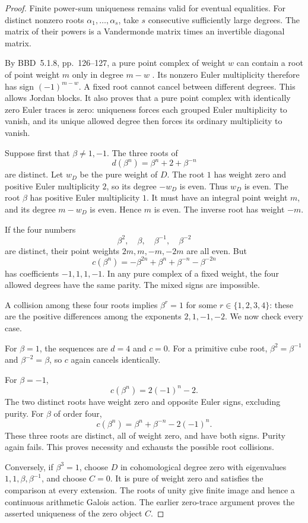 \documentclass[11pt,a4paper]{article}
\theoremstyle{named}\newtheorem{finding}{Finding}[section]
\theoremstyle{definition}\newtheorem{definition}[finding]{Definition}
\theoremstyle{remark}\newtheorem{remark}[finding]{Remark}
\begin{document}
\begin{proof}
Finite power-sum uniqueness remains valid for eventual
equalities. For distinct nonzero roots
\(\alpha_1,\ldots,\alpha_s\), take \(s\) consecutive
sufficiently large degrees. The matrix of their powers
is a Vandermonde matrix times an invertible diagonal
matrix.

By BBD~5.1.8, pp.~126--127, a pure point complex of
weight \(w\) can contain a root of point weight \(m\)
only in degree \(m-w\) \cite{BBD}.
Its nonzero Euler multiplicity therefore has sign
\((-1)^{m-w}\). A fixed root cannot cancel between
different degrees. This allows Jordan blocks.
It also proves that a pure point complex with
identically zero Euler traces is zero: uniqueness
forces each grouped Euler multiplicity to vanish,
and its unique allowed degree then forces its
ordinary multiplicity to vanish.

Suppose first that \(\beta\ne1,-1\).
The three roots of
\[
                     d(\beta^n)=\beta^n+2+\beta^{-n}
\]
are distinct. Let \(w_D\) be the pure weight of \(D\).
The root \(1\) has weight zero and positive Euler
multiplicity \(2\), so its degree \(-w_D\) is even.
Thus \(w_D\) is even.
The root \(\beta\) has positive Euler multiplicity \(1\).
It must have an integral point weight \(m\), and its
degree \(m-w_D\) is even. Hence \(m\) is even.
The inverse root has weight \(-m\).

If the four numbers
\[
                    \beta^2,\quad\beta,\quad
                    \beta^{-1},\quad\beta^{-2}
\]
are distinct, their point weights \(2m,m,-m,-2m\)
are all even. But
\[
                 c(\beta^n)
                  =-\beta^{2n}+\beta^n+\beta^{-n}-\beta^{-2n}
\]
has coefficients \(-1,1,1,-1\). In any pure complex
of a fixed weight, the four allowed degrees have the
same parity. The mixed signs are impossible.

A collision among these four roots implies
\(\beta^r=1\) for some \(r\in\{1,2,3,4\}\):
these are the positive differences among the exponents
\(2,1,-1,-2\). We now check every case.

For \(\beta=1\), the sequences are \(d=4\) and \(c=0\).
For a primitive cube root,
\(\beta^2=\beta^{-1}\) and
\(\beta^{-2}=\beta\), so \(c\) again cancels identically.

For \(\beta=-1\),
\[
                         c(\beta^n)=2(-1)^n-2.
\]
The two distinct roots have weight zero and opposite
Euler signs, excluding purity.
For \(\beta\) of order four,
\[
                         c(\beta^n)
                         =\beta^n+\beta^{-n}-2(-1)^n.
\]
These three roots are distinct, all of weight zero,
and have both signs. Purity again fails.
This proves necessity and exhausts the possible
root collisions.

Conversely, if \(\beta^3=1\), choose \(D\) in
cohomological degree zero with eigenvalues
\(1,1,\beta,\beta^{-1}\), and choose \(C=0\).
It is pure of weight zero and satisfies the comparison
at every extension. The roots of unity give finite
image and hence a continuous arithmetic Galois action.
The earlier zero-trace argument proves the asserted
uniqueness of the zero object \(C\).
\end{proof}
\end{document}
